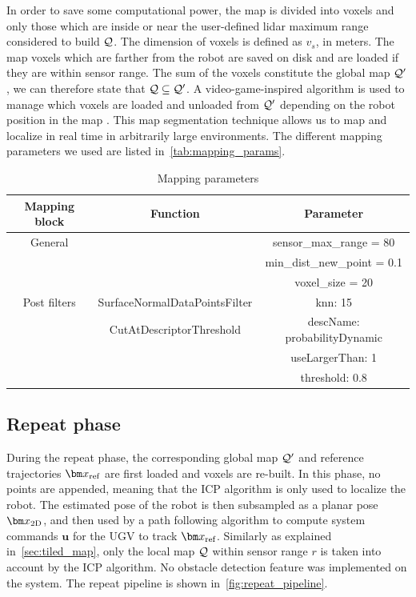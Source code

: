 In order to save some computational power, the map is divided into voxels and only those which are inside or near the user-defined lidar maximum range considered to build $\mathcal{Q}$.
The dimension of voxels is defined as $v_s$, in meters.
The map voxels which are farther from the robot are saved on disk and are loaded if they are within sensor range.
The sum of the voxels constitute the global map $\mathcal{Q}'$, we can therefore state that $\mathcal{Q} \subseteq \mathcal{Q}'$.
A video-game-inspired algorithm is used to manage which voxels are loaded and unloaded from $\mathcal{Q}'$ depending on the robot position in the map \transform{\robotf}{\mapf}.
This map segmentation technique allows us to map and localize in real time in arbitrarily large environments.
The different mapping parameters we used are listed in~\autoref{tab:mapping_params}.


\begin{table}[htpb]
	\caption{Mapping parameters}
	\begin{center}
		\begin{tabular}{c c c}
			Mapping block & Function & Parameter \\
			\hline
			General & & sensor\_max\_range = 80 \\			 
			& & min\_dist\_new\_point = 0.1 \\
			& & voxel\_size = 20 \\
			\hline
			Post filters & SurfaceNormalDataPointsFilter & knn: 15 \\
			& CutAtDescriptorThreshold & descName: probabilityDynamic \\
			& & useLargerThan: 1 \\
			& & threshold: 0.8 \\
		\end{tabular}
	\end{center}
	\label{tab:mapping_params}
\end{table}

\subsection{Repeat phase}
\label{sec:repeat_phase}

During the repeat phase, the corresponding global map $\mathcal{Q}'$ and reference trajectories $\reftraj$ are first loaded and voxels are re-built.
In this phase, no points are appended, meaning that the \ac{ICP} algorithm is only used to localize the robot.
The estimated pose of the robot \transform{\robotf}{\mapf} is then subsampled as a planar pose $\poseplane$, and then used by a path following algorithm to compute system commands $\bm u$ for the \ac{UGV} to track $\reftraj$.
Similarly as explained in~\autoref{sec:tiled_map}, only the local map $\mathcal{Q}$ within sensor range $r$ is taken into account by the \ac{ICP} algorithm.
No obstacle detection feature was implemented on the system.
The repeat pipeline is shown in~\autoref{fig:repeat_pipeline}.


